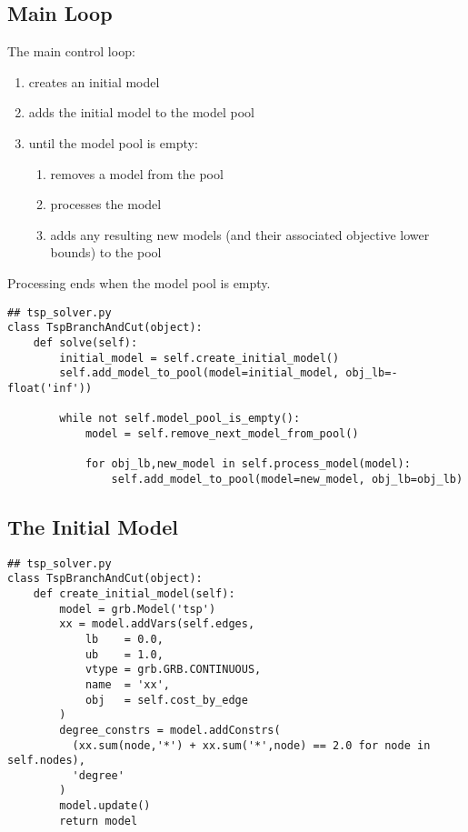 \documentclass{article}
\begin{document}
\subsection{Main Loop}
\begin{flushleft}

The main control loop:

\begin{enumerate}
\item creates an initial model
\item adds the initial model to the model pool
\item until the model pool is empty:
  \begin{enumerate}
  \item removes a model from the pool
  \item processes the model
  \item adds any resulting new models (and their associated objective lower bounds) to the pool
  \end{enumerate}
\end{enumerate}

Processing ends when the model pool is empty.

\begin{lstlisting}
## tsp_solver.py
class TspBranchAndCut(object):
    def solve(self):
        initial_model = self.create_initial_model()
        self.add_model_to_pool(model=initial_model, obj_lb=-float('inf'))

        while not self.model_pool_is_empty():
            model = self.remove_next_model_from_pool()

            for obj_lb,new_model in self.process_model(model):
                self.add_model_to_pool(model=new_model, obj_lb=obj_lb)
\end{lstlisting}

\end{flushleft}


\subsection{The Initial Model}
\begin{flushleft}

\begin{lstlisting}
## tsp_solver.py
class TspBranchAndCut(object):
    def create_initial_model(self):
        model = grb.Model('tsp')
        xx = model.addVars(self.edges,
            lb    = 0.0,
            ub    = 1.0,
            vtype = grb.GRB.CONTINUOUS,
            name  = 'xx',
            obj   = self.cost_by_edge
        )
        degree_constrs = model.addConstrs(
          (xx.sum(node,'*') + xx.sum('*',node) == 2.0 for node in self.nodes),
          'degree'
        )
        model.update()
        return model
\end{lstlisting}

\end{flushleft}
\end{document}
